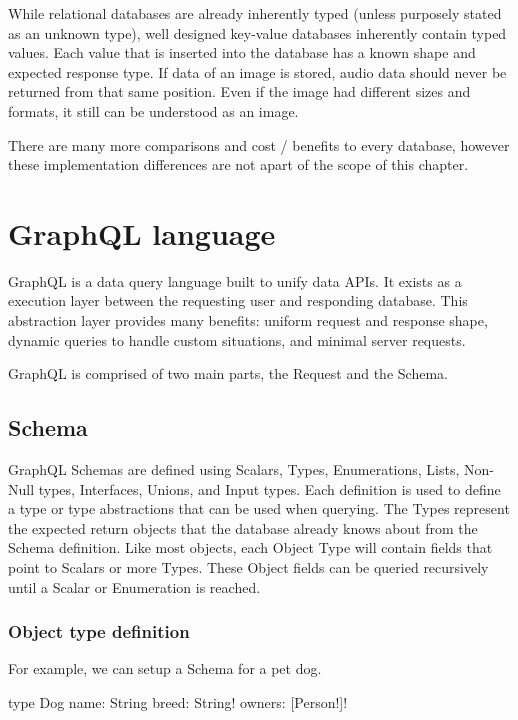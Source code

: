 \documentclass[stat,dissertation]{puthesis}\usepackage[]{graphicx}\usepackage{xcolor}
\begin{document}
While relational databases are already inherently typed (unless purposely stated as an unknown type), well designed key-value databases inherently contain typed values.  Each value that is inserted into the database has a known shape and expected response type.  If data of an image is stored, audio data should never be returned from that same position.  Even if the image had different sizes and formats, it still can be understood as an image.

There are many more comparisons and cost / benefits to every database, however these implementation differences are not apart of the scope of this chapter.



\section{GraphQL language}

GraphQL is a data query language built to unify data APIs.  It exists as a execution layer between the requesting user and responding database.  This abstraction layer provides many benefits: uniform request and response shape, dynamic queries to handle custom situations, and minimal server requests.

GraphQL is comprised of two main parts, the Request and the Schema.

\subsection{Schema}

GraphQL Schemas are defined using Scalars, Types, Enumerations, Lists, Non-Null types, Interfaces, Unions, and Input types.  Each definition is used to define a type or type abstractions that can be used when querying.  The Types represent the expected return objects that the database already knows about from the Schema definition.  Like most objects, each Object Type will contain fields that point to Scalars or more Types.  These Object fields can be queried recursively until a Scalar or Enumeration is reached.

\subsubsection{Object type definition}

For example, we can setup a Schema for a pet dog.

\begin{graphqlcode}
type Dog {
  name: String
  breed: String!
  owners: [Person!]!
}
\end{graphqlcode}
\end{document}
